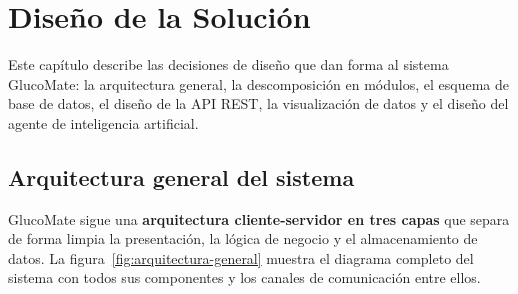
\chapter{Diseño de la Solución}
\label{cap:diseno}

Este capítulo describe las decisiones de diseño que dan forma al sistema GlucoMate:
la arquitectura general, la descomposición en módulos, el esquema de base de datos,
el diseño de la API REST, la visualización de datos y el diseño del agente de
inteligencia artificial.

\section{Arquitectura general del sistema}
\label{sec:arquitectura-general}

GlucoMate sigue una \textbf{arquitectura cliente-servidor en tres capas} que separa
de forma limpia la presentación, la lógica de negocio y el almacenamiento de datos.
La figura~\ref{fig:arquitectura-general} muestra el diagrama completo del sistema
con todos sus componentes y los canales de comunicación entre ellos.

